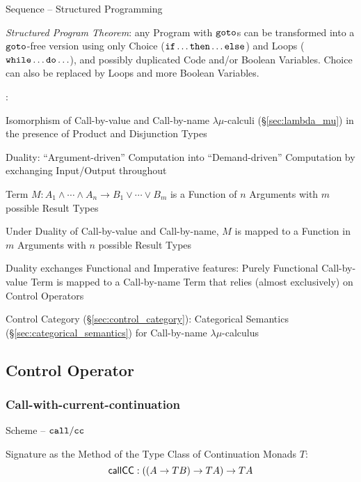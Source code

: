 Sequence -- Structured Programming

\emph{Structured Program Theorem}: any Program with $\mathtt{goto}$s can
be transformed into a $\mathtt{goto}$-free version using only Choice
($\mathtt{if}\ldots\mathtt{then}\ldots\mathtt{else}$) and Loops
($\mathtt{while}\ldots\mathtt{do}\ldots$), and possibly duplicated Code
and/or Boolean Variables. Choice can also be replaced by Loops and
more Boolean Variables.


\asterism


\cite{selinger01}:

Isomorphism of Call-by-value and Call-by-name $\lambda\mu$-calculi
(\S\ref{sec:lambda_mu}) in the presence of Product and Disjunction
Types

Duality: ``Argument-driven'' Computation into ``Demand-driven''
Computation by exchanging Input/Output throughout

Term $M : A_1 \wedge \cdots \wedge A_n \rightarrow B_1 \vee \cdots
\vee B_m$ is a Function of $n$ Arguments with $m$ possible Result
Types

Under Duality of Call-by-value and Call-by-name, $M$ is mapped to a
Function in $m$ Arguments with $n$ possible Result Types

Duality exchanges Functional and Imperative features: Purely
Functional Call-by-value Term is mapped to a Call-by-name Term that
relies (almost exclusively) on Control Operators %

Control Category (\S\ref{sec:control_category}): Categorical Semantics
(\S\ref{sec:categorical_semantics}) for Call-by-name
$\lambda\mu$-calculus



\subsection{Control Operator}\label{sec:control_operator}

\subsubsection{Call-with-current-continuation}\label{sec:callcc}

Scheme -- $\mathtt{call/cc}$

Signature as the Method of the Type Class of Continuation Monads $T$:
\[
  \mathsf{callCC} : ((A \rightarrow T B) \rightarrow T A) \rightarrow T A
\]

